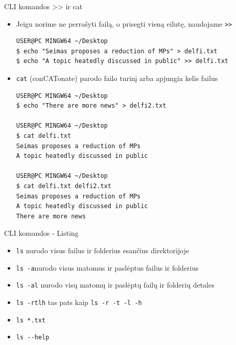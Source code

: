 \documentclass[11pt,xcolor=table]{beamer}
\begin{document}
\begin{frame}[fragile]{CLI komandos >> ir cat}

\begin{itemize}

\item Jeigu norime ne perrašyti failą, o prisegti vieną eilutę, naudojame \colorbox{listinggray}{\lstinline|>>|}
\begin{lstlisting}
USER@PC MINGW64 ~/Desktop
$ echo "Seimas proposes a reduction of MPs" > delfi.txt
$ echo "A topic heatedly discussed in public" >> delfi.txt
\end{lstlisting}

\item \colorbox{listinggray}{\lstinline|cat|} (conCATonate) parodo failo turinį arba apjungia kelis failus
\begin{lstlisting}
USER@PC MINGW64 ~/Desktop
$ echo "There are more news" > delfi2.txt

USER@PC MINGW64 ~/Desktop
$ cat delfi.txt
Seimas proposes a reduction of MPs
A topic heatedly discussed in public

USER@PC MINGW64 ~/Desktop
$ cat delfi.txt delfi2.txt
Seimas proposes a reduction of MPs
A topic heatedly discussed in public
There are more news

\end{lstlisting}


\end{itemize}
\end{frame}
\begin{frame}{CLI komandos - Listing}
\begin{itemize}
\item \colorbox{listinggray}{\lstinline|ls|} nurodo visus failus ir folderius esančius direktorijoje
\item \colorbox{listinggray}{\lstinline|ls -a|}nurodo visus matomus ir paslėptus failus ir folderius
\item \colorbox{listinggray}{\lstinline|ls -al|} nurodo visų matomų ir paslėptų failų ir folderių detales
\item \colorbox{listinggray}{\lstinline|ls -rtlh|} tas pats kaip \colorbox{listinggray}{\lstinline|ls -r -t -l -h|}
\item \colorbox{listinggray}{\lstinline|ls *.txt|}
\item \colorbox{listinggray}{\lstinline|ls --help|} 
\end{itemize}
\end{frame}
\end{document}
